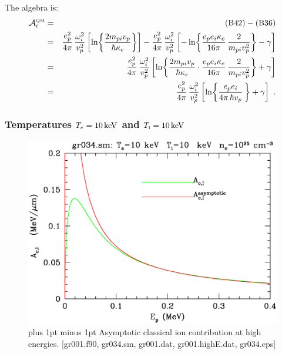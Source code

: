 \documentclass[preprint,12pt,eqsecnum,nofootinbib,amsmath,amssymb]{revtex4}
\newcommand{\smI}{{\rm\scriptscriptstyle I}}
\newcommand{\smQM}{{\rm\scriptscriptstyle QM}}
\newcommand{\footnoteskip}{\baselineskip 12pt plus 1pt minus 1pt}
\begin{document}
The algebra is:
\begin{eqnarray}
  {\cal A}^\smQM_i
  &=& {\rm (B42)} - {\rm (B36)}
\\
  &=&
  \frac{e_p^2}{4\pi}\,\frac{\omega_i^2}{v_p^2}\left[
  \ln\!\left\{\frac{2 m_{pi} v_p}{\hbar \kappa_e} \right\}
  \right]
  -
  \frac{e_p^2}{4\pi}\,\frac{\omega_i^2}{v_p^2}\left[
  -\ln\!\left\{\frac{e_p e_i \kappa_e}{16\pi}\,
  \frac{2}{m_{pi} v_p^2} \right\}
  -\gamma
  \right]
\\
  &=&
  \frac{e_p^2}{4\pi}\,\frac{\omega_i^2}{v_p^2}\left[
  \ln\!\left\{\frac{2 m_{pi} v_p}{\hbar \kappa_e} \cdot
  \frac{e_p e_i \kappa_e}{16\pi}\,
  \frac{2}{m_{pi} v_p^2} \right\}
  +\gamma
  \right]
\\
  &=&
  \frac{e_p^2}{4\pi}\,\frac{\omega_i^2}{v_p^2}\left[
  \ln\!\left\{
  \frac{e_p e_i}{4\pi\, \hbar v_p}\,
  \right\}
  +\gamma
  \right] \ .
\end{eqnarray}


\pagebreak
\subsubsection{Temperatures $T_e=10\,{\rm keV}$ and $T_\smI=10\,{\rm keV}$}

\vskip-2cm 
\begin{figure}[h!]
\includegraphics[scale=0.45]{gr034.eps} 
\vskip-0.8cm 
\caption{\footnoteskip  
  Asymptotic classical ion contribution at high energies. [gr001.f90,
  gr034.sm, gr001.dat, gr001.highE.dat, gr034.eps] 
}
\label{fig:gr034}
\end{figure}
\end{document}
